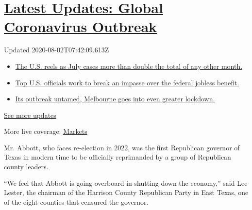 \hypertarget{latest-updates-global-coronavirus-outbreak}{%
\section{\texorpdfstring{\href{https://www.nytimes.com/2020/08/01/world/coronavirus-covid-19.html?action=click\&pgtype=Article\&state=default\&region=MAIN_CONTENT_1\&context=storylines_live_updates}{Latest
Updates: Global Coronavirus
Outbreak}}{Latest Updates: Global Coronavirus Outbreak}}\label{latest-updates-global-coronavirus-outbreak}}

Updated 2020-08-02T07:42:09.613Z

\begin{itemize}
\tightlist
\item
  \href{https://www.nytimes.com/2020/08/01/world/coronavirus-covid-19.html?action=click\&pgtype=Article\&state=default\&region=MAIN_CONTENT_1\&context=storylines_live_updates\#link-34047410}{The
  U.S. reels as July cases more than double the total of any other
  month.}
\item
  \href{https://www.nytimes.com/2020/08/01/world/coronavirus-covid-19.html?action=click\&pgtype=Article\&state=default\&region=MAIN_CONTENT_1\&context=storylines_live_updates\#link-780ec966}{Top
  U.S. officials work to break an impasse over the federal jobless
  benefit.}
\item
  \href{https://www.nytimes.com/2020/08/01/world/coronavirus-covid-19.html?action=click\&pgtype=Article\&state=default\&region=MAIN_CONTENT_1\&context=storylines_live_updates\#link-2bc8948}{Its
  outbreak untamed, Melbourne goes into even greater lockdown.}
\end{itemize}

\href{https://www.nytimes.com/2020/08/01/world/coronavirus-covid-19.html?action=click\&pgtype=Article\&state=default\&region=MAIN_CONTENT_1\&context=storylines_live_updates}{See
more updates}

More live coverage:
\href{https://www.nytimes.com/live/2020/07/31/business/stock-market-today-coronavirus?action=click\&pgtype=Article\&state=default\&region=MAIN_CONTENT_1\&context=storylines_live_updates}{Markets}

Mr. Abbott, who faces re-election in 2022, was the first Republican
governor of Texas in modern time to be officially reprimanded by a group
of Republican county leaders.

``We feel that Abbott is going overboard in shutting down the economy,''
said Lee Lester, the chairman of the Harrison County Republican Party in
East Texas, one of the eight counties that censured the governor.

